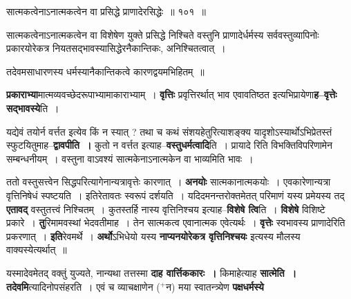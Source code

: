 \documentclass[article,12pt,a4paper]{memoir}
\newcommand{\add}[1]{($^{+}$#1)}
\begin{document}
	  \bigskip
	  \begingroup
	

	  \pstart {}सात्मकत्वेनाऽनात्मकत्वेन वा प्रसिद्धे प्राणादेरसिद्धेः ॥ १०१ ॥
	\pend
      
	  \endgroup
	 

	  \pstart {}सात्मकत्वेनाऽनात्मकत्वेन वा विशेषेण युक्ते प्रसिद्धे निश्चिते वस्तुनि प्राणादेर्धर्मस्य सर्ववस्तुव्यापिनोः प्रकारयोरेकत्र नियतसद्भावस्यासिद्धेरनैकान्तिकः, अनिश्चितत्वात् ।
	\pend
        

	  \pstart तदेवमसाधारणस्य धर्मस्यानैकान्तिकत्वे कारणद्वयमभिहितम् ॥
	\pend
      
	  \endgroup
	

	  \pstart \textbf{प्रकाराभ्या}मात्मव्यवच्छेदरूपाभ्यामाकाराभ्याम् । \textbf{वृत्तिः} प्रवृत्तिरर्थात् भाव एवावतिष्ठत इत्यभिप्रायेणा\textbf{ह--वृत्तेः सद्भावस्ये}ति ।
	\pend
      

	  \pstart यद्येवं तयोर्न वर्त्तत इत्येव किं न स्यात् ? तथा च कथं संशयहेतुरित्याशङ्क्य यादृशोऽस्यार्थोऽभिप्रेतस्तं स्फुटयितुमाह--\textbf{द्वावपीति ।} कुतो न वर्त्तत इत्याह--\textbf{वस्तुधर्मत्वादि}ति । प्रायादे  रिति विभक्तिविपरिणामेन सम्बन्धनीयम् । वस्तुना वाऽवश्यं सात्मकेनाऽनात्मकेन वा भाव्यमिति भावः ।
	\pend
      

	  \pstart ततो वस्तुसत्त्वेन सिद्धपरित्यागेनान्यत्रावृत्तेः कारणात् । \textbf{अनयोः} सात्मकानात्मकयोः । एवकारेणान्यत्रा  वृत्तिनिषेधं स्पष्टयति । इतिरेतावतः स्वरूपं दर्शयति । यदिदमनन्तरोक्तमेतत् परिमाणं यस्य प्रमेयस्य तद् \textbf{एतावद्} वस्तुतत्त्वं निश्चितम् । कुतस्तर्हि नास्य वृत्तिनिश्चय इत्याह--\textbf{विशेषे त्वि}ति । \textbf{विशेषे} विशिष्टे प्रकारे । \textbf{तु}रिमामवस्थां भेदवतीमाह । तेन सात्मकत्व  एवानात्मक एवेत्यर्थः । \textbf{वृत्तेः} स्वभावस्य प्राणादेरिति प्रकरणात् । \textbf{इति}रेवमर्थे । \textbf{अर्थो}ऽभिधेयो यस्य \textbf{नाप्यनयोरेकत्र वृत्तिनिश्चयः} इत्यस्य मौलस्य वाक्यस्येत्यर्थात् ॥
	\pend
      

	  \pstart यस्मादेवमेतद् वक्तुं युज्यते, नान्यथा तत्तस्मा \leavevmode{} \textbf{दाह वार्त्तिककारः ।} किमाहेत्याह \textbf{सात्मेति । तदेवमि}त्यादिनोपसंहरति । एवं च व्याचक्षाणेन \add{न} मया स्वातन्त्र्येण \textbf{पक्षधर्मस्ये}  \leavevmode{} 
	  
\end{document}
